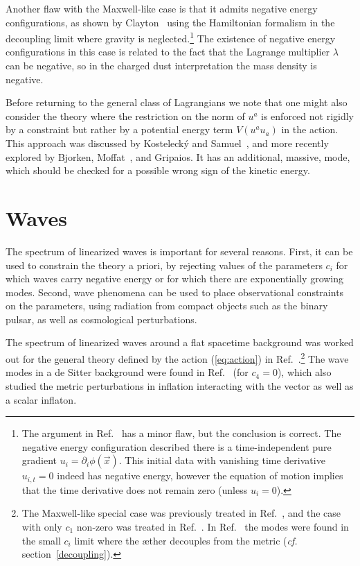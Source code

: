 \documentclass[aps]{ws-procs9x6}
\begin{document}
Another flaw with the Maxwell-like case is that it admits
negative energy configurations, as shown by
Clayton~\cite{Clayton} using the Hamiltonian formalism in the
decoupling limit where gravity is neglected.\footnote{The
argument in Ref.~ has a minor flaw, but the
conclusion is correct. The negative energy configuration
described there is a time-independent pure gradient
$u_i=\partial_i \phi(\vec{x})$. This initial data with vanishing
time derivative $u_{i,t}=0$ indeed has negative energy, however
the equation of motion implies that the time derivative does not
remain zero (unless $u_i=0$).} The existence of negative energy
configurations in this case is related to the fact that the
Lagrange multiplier $\lambda$ can be negative, so in the charged
dust interpretation the mass density is negative.

Before returning to the general class of Lagrangians
we note that one might also consider the theory where the
restriction on the norm of $u^a$ is enforced not rigidly
by a constraint but rather by a potential energy term
$V(u^a u_a)$ in the action. This approach was
discussed by Kosteleck\'{y} and Samuel~\cite{KosSam},
and more recently explored by Bjorken\cite{Bjorken:2001pe},
Moffat~\cite{Moffat:2002nu}, and
Gripaios\cite{Gripaios:2004ms}.
It has an additional, massive, mode,
which should be checked for a possible wrong
sign of the kinetic energy.

\section{Waves}

The
spectrum of linearized waves is important
for several reasons.
First, it can be used to constrain the theory
a priori, by
rejecting values of the parameters
$c_i$ for which waves carry negative energy or
for which there are exponentially growing modes.
Second, wave phenomena can be used to place
observational constraints on the parameters,
using radiation from compact objects such as the binary pulsar,
as well as cosmological perturbations.

The spectrum of linearized waves around a flat spacetime
background was worked out for the general theory defined by the
action (\ref{eq:action}) in Ref.~.\footnote{The
Maxwell-like special case was previously treated in
Ref.~, and the case with only $c_1$ non-zero was
treated in Ref.~. In Ref.~ the modes
were found in the small $c_i$ limit where the {\ae}ther decouples
from the metric ({\it cf.} section~\ref{decoupling}).} The wave
modes in a de Sitter background were found in Ref.~
(for $c_4=0$), which also studied the metric perturbations in
inflation interacting with the vector as well as a scalar
inflaton.
\end{document}
